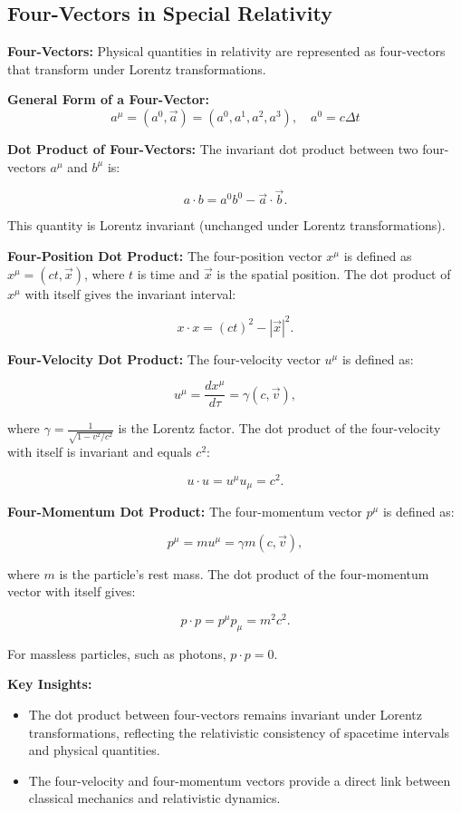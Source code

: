 \documentclass{article}
\newcommand{\eqbox}[1]{\begin{tcolorbox}[colback=gray!10] #1 \end{tcolorbox}}
\newcommand{\conceptbox}[1]{\begin{tcolorbox}[colback=blue!10] #1 \end{tcolorbox}}
\begin{document}
\subsection{Four-Vectors in Special Relativity}
\conceptbox{
\textbf{Four-Vectors:}
Physical quantities in relativity are represented as four-vectors that transform under Lorentz transformations.
}
\eqbox{
\textbf{General Form of a Four-Vector:}
\[
a^\mu = (a^0, \vec{a}) = (a^0, a^1, a^2, a^3), \quad a^0 = c\Delta t
\]
}
\conceptbox{
\textbf{Dot Product of Four-Vectors:}
The invariant dot product between two four-vectors \( a^\mu \) and \( b^\mu \) is:
\eqbox{
\[
a \cdot b = a^0 b^0 - \vec{a} \cdot \vec{b}.
\]
}
This quantity is Lorentz invariant (unchanged under Lorentz transformations).

\textbf{Four-Position Dot Product:}
The four-position vector \( x^\mu \) is defined as \( x^\mu = (ct, \vec{x}) \), where \( t \) is time and \( \vec{x} \) is the spatial position. The dot product of \( x^\mu \) with itself gives the invariant interval:
\eqbox{
\[
x \cdot x = (ct)^2 - |\vec{x}|^2.
\]
}

\textbf{Four-Velocity Dot Product:}
The four-velocity vector \( u^\mu \) is defined as:
\eqbox{
\[
u^\mu = \frac{dx^\mu}{d\tau} = \gamma (c, \vec{v}),
\]
}
where \( \gamma = \frac{1}{\sqrt{1 - v^2/c^2}} \) is the Lorentz factor. The dot product of the four-velocity with itself is invariant and equals \( c^2 \):
\eqbox{
\[
u \cdot u = u^\mu u_\mu = c^2.
\]
}

\textbf{Four-Momentum Dot Product:}
The four-momentum vector \( p^\mu \) is defined as:
\eqbox{
\[
p^\mu = m u^\mu = \gamma m (c, \vec{v}),
\]
}
where \( m \) is the particle's rest mass. The dot product of the four-momentum vector with itself gives:
\eqbox{
\[
p \cdot p = p^\mu p_\mu = m^2 c^2.
\]
}
For massless particles, such as photons, \( p \cdot p = 0 \).

\textbf{Key Insights:}
\begin{itemize}
    \item The dot product between four-vectors remains invariant under Lorentz transformations, reflecting the relativistic consistency of spacetime intervals and physical quantities.
    \item The four-velocity and four-momentum vectors provide a direct link between classical mechanics and relativistic dynamics.
\end{itemize}
}
\end{document}
